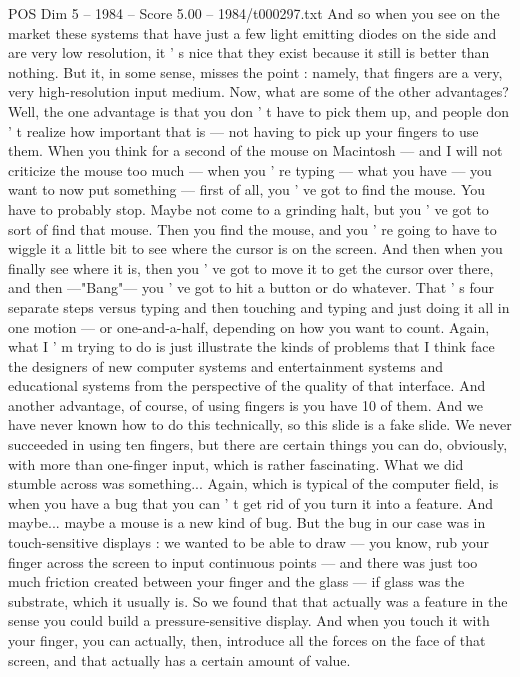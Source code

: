 \begin{textsample}{POS Dim 5 – 1984 – Score 5.00 – 1984/t000297.txt}
And so when you see on the market these systems that have just a few light emitting diodes on the side and are very low resolution, it ' s nice that they exist because it still is better than nothing.
But it, in some sense, misses the point : namely, that fingers are a very, very high-resolution input medium.
Now, what are some of the other advantages?
Well, the one advantage is that you don ' t have to pick them up, and people don ' t realize how important that is — not having to pick up your fingers to use them.
When you think for a second of the mouse on Macintosh — and I will not criticize the mouse too much — when you ' re typing — what you have — you want to now put something — first of all, you ' ve got to find the mouse.
You have to probably stop.
Maybe not come to a grinding halt, but you ' ve got to sort of find that mouse.
Then you find the mouse, and you ' re going to have to wiggle it a little bit to see where the cursor is on the screen.
And then when you finally see where it is, then you ' ve got to move it to get the cursor over there, and then —"Bang"— you ' ve got to hit a button or do whatever.
That ' s four separate steps versus typing and then touching and typing and just doing it all in one motion — or one-and-a-half, depending on how you want to count.
Again, what I ' m trying to do is just illustrate the kinds of problems that I think face the designers of new computer systems and entertainment systems and educational systems from the perspective of the quality of that interface.
And another advantage, of course, of using fingers is you have 10 of them.
And we have never known how to do this technically, so this slide is a fake slide.
We never succeeded in using ten fingers, but there are certain things you can do, obviously, with more than one-finger input, which is rather fascinating.
What we did stumble across was something...
Again, which is typical of the computer field, is when you have a bug that you can ' t get rid of you turn it into a feature.
And maybe... maybe a mouse is a new kind of bug.
But the bug in our case was in touch-sensitive displays : we wanted to be able to draw — you know, rub your finger across the screen to input continuous points — and there was just too much friction created between your finger and the glass — if glass was the substrate, which it usually is.
So we found that that actually was a feature in the sense you could build a pressure-sensitive display.
And when you touch it with your finger, you can actually, then, introduce all the forces on the face of that screen, and that actually has a certain amount of value.

\end{textsample}
